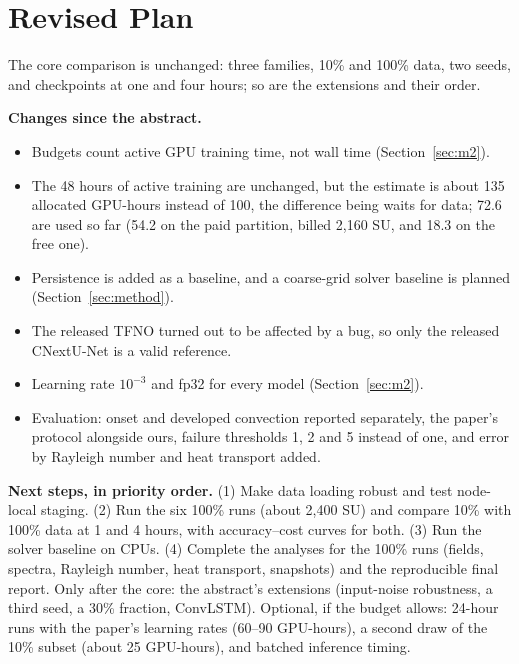 \documentclass[11pt]{article}
\begin{document}
\section{Revised Plan}
\label{sec:plan}

The core comparison is unchanged: three families, 10\% and 100\% data, two seeds, and checkpoints at one and four
hours; so are the extensions and their order.

\textbf{Changes since the abstract.}
\begin{itemize}
    \item Budgets count active GPU training time, not wall time (Section~\ref{sec:m2}).
    \item The 48 hours of active training are unchanged, but the estimate is about 135 allocated GPU-hours instead
    of 100, the difference being waits for data; 72.6
    are used so far (54.2 on the paid partition, billed 2,160 SU, and 18.3 on the free one).
    \item Persistence is added as a baseline, and a coarse-grid solver baseline is planned (Section~\ref{sec:method}).
    \item The released TFNO turned out to be affected by a bug, so only the released CNextU-Net is a valid reference.
    \item Learning rate $10^{-3}$ and fp32 for every model (Section~\ref{sec:m2}).
    \item Evaluation: onset and developed convection reported separately, the paper's protocol alongside ours,
    failure thresholds 1, 2 and 5 instead of one, and error by Rayleigh number and heat transport added.
\end{itemize}

\textbf{Next steps, in priority order.} (1) Make data loading robust and test node-local staging. (2) Run the six
100\% runs (about 2,400 SU) and compare 10\% with 100\% data at 1 and 4 hours, with accuracy--cost curves for both.
(3) Run the solver baseline on CPUs. (4) Complete the analyses for the 100\% runs (fields, spectra, Rayleigh number,
heat transport, snapshots) and the reproducible final report. Only after the core: the abstract's extensions
(input-noise robustness, a third seed, a 30\% fraction, ConvLSTM). Optional, if the budget allows: 24-hour runs with
the paper's learning rates (60--90 GPU-hours), a second draw of the 10\% subset (about 25 GPU-hours), and batched
inference timing.

\clearpage
\appendix
\makeatletter
\renewcommand{\@seccntformat}[1]{\ifcsname prefix@#1\endcsname\csname prefix@#1\endcsname\fi
  \csname the#1\endcsname\ifcsname prefix@#1\endcsname:\fi\quad}
\newcommand{\prefix@section}{Appendix~}
\makeatother
\end{document}
